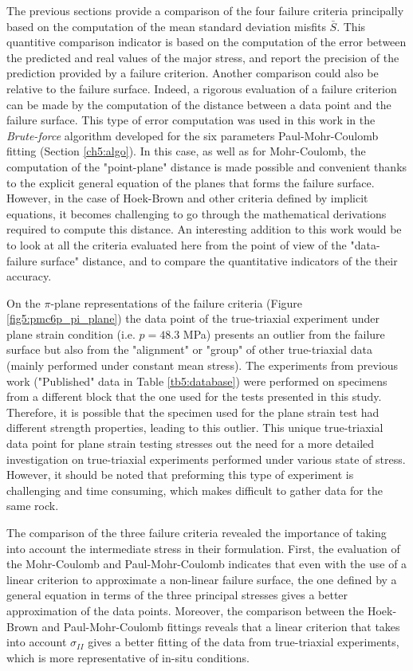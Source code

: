 The previous sections provide a comparison of the four failure criteria principally based on the computation of the mean standard deviation misfits $\bar{S}$. This quantitive comparison indicator is based on the computation of the error between the predicted and real values of the major stress, and report the precision of the prediction provided by a failure criterion. Another comparison could also be relative to the failure surface. Indeed, a rigorous evaluation  of a failure criterion can be made by the computation of the distance between a data point and the failure surface. This type of error computation was used in this work in the \emph{Brute-force} algorithm developed for the six parameters Paul-Mohr-Coulomb fitting (Section \ref{ch5:algo}). In this case, as well as for Mohr-Coulomb, the computation of the "point-plane" distance is made possible and convenient thanks to the explicit general equation of the planes that forms the failure surface. However, in the case of Hoek-Brown and other criteria defined by implicit equations, it becomes challenging to go through the mathematical derivations required to compute this distance. An interesting addition to this work would be to look at all the criteria evaluated here from the point of view of the "data-failure surface" distance, and to compare the quantitative indicators of the their accuracy.

On the $\pi$-plane representations of the failure criteria (Figure \ref{fig5:pmc6p_pi_plane}) the data point of the true-triaxial experiment under plane strain condition (i.e. $p = 48.3$ \si{MPa}) presents an outlier from the failure surface but also from the "alignment" or "group" of other true-triaxial data (mainly performed under constant mean stress). The experiments from previous work ("Published" data in Table \ref{tb5:database}) were performed on specimens from a different block that the one used for the tests presented in this study. Therefore, it is possible that the specimen used for the plane strain test had different strength properties, leading to this outlier. This unique true-triaxial data point for plane strain testing stresses out the need for a more detailed investigation on true-triaxial experiments performed under various state of stress. However, it should be noted that preforming this type of experiment is challenging and time consuming, which makes difficult to gather data for the same rock.

The comparison of the three failure criteria revealed the importance of taking into account the intermediate stress in their formulation. First, the evaluation of the Mohr-Coulomb and Paul-Mohr-Coulomb indicates that even with the use of a linear criterion to approximate a non-linear failure surface, the one defined by a general equation in terms of the three principal stresses gives a better approximation of the data points. Moreover, the comparison between the Hoek-Brown and Paul-Mohr-Coulomb fittings reveals that a linear criterion that takes into account $\sigma_{II}$ gives a better fitting of the data from true-triaxial experiments, which is more representative of in-situ conditions. 

